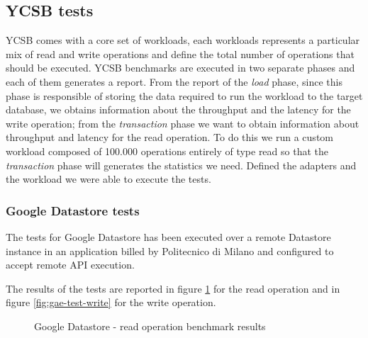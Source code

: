 \subsection{YCSB tests}
YCSB comes with a core set of workloads, each workloads represents a particular mix of read and write operations and define the total number of operations that should be executed. 
\noindent YCSB benchmarks are executed in two separate phases and each of them generates a report. From the report of the \textit{load} phase, since this phase is responsible of storing the data required to run the workload to the target database, we obtains information about the throughput and the latency for the write operation; from the \textit{transaction} phase we want to obtain information about throughput and latency for the read operation. To do this we run a custom workload composed of 100.000 operations entirely of type read so that the \textit{transaction} phase will generates the statistics we need.
\noindent Defined the adapters and the workload we were able to execute the tests.

\subsubsection{Google Datastore tests}
The tests for Google Datastore has been executed over a remote Datastore instance in an application billed by Politecnico di Milano and configured to accept remote API execution.

\noindent The results of the tests are reported in figure \ref{fig:gae-test-read} for the read operation and in figure \ref{fig:gae-test-write} for the write operation.
 
\begin{figure}[tbh]
  \centering
  \caption{Google Datastore - read operation benchmark results}
  \label{fig:gae-test-read}
\end{figure} 

